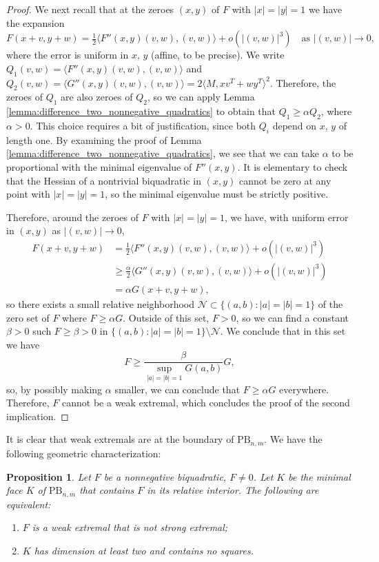 \documentclass[a4paper]{article}
\numberwithin{equation}{section}
\newtheorem{prop}[theorem]{Proposition}
\theoremstyle{definition}
\theoremstyle{remark}
\newcommand{\pbnm}{\mathrm{PB}_{n,m}}
\begin{document}
\begin{proof}
We next recall that at the zeroes $(x,y)$ of $F$ with $|x|=|y|=1$  we have the expansion
$$
F(x+v,y+w)=\tfrac{1}{2}\langle F''(x,y)(v,w),(v,w)\rangle+o(|(v,w)|^3)\quad\text{as }|(v,w)|\to 0,
$$
where the error is uniform in $x,\,y$ (affine, to be precise). We write $Q_1(v,w)=\langle F''(x,y)(v,w),(v,w)\rangle$ and $Q_2(v,w)=\langle G''(x,y)(v,w),(v,w)\rangle=2\langle M,xv^T+wy^T\rangle^2$. Therefore, the zeroes of $Q_1$ are also zeroes of $Q_2$, so we can apply Lemma \ref{lemma:difference_two_nonnegative_quadratics} to obtain that $Q_1\geq \alpha Q_2$, where $\alpha>0$. This choice requires a bit of justification, since both $Q_i$ depend on $x,\,y$ of length one. By examining the proof of Lemma \ref{lemma:difference_two_nonnegative_quadratics}, we see that we can take $\alpha$ to be proportional with the minimal eigenvalue of $F''(x,y)$. It is elementary to check that the Hessian of a nontrivial biquadratic in $(x,y)$ cannot be zero at any point with $|x|=|y|=1$, so the minimal eigenvalue must be strictly positive.

Therefore, around the zeroes of $F$ with $|x|=|y|=1$, we have, with uniform error in $(x,y)$ as $|(v,w)|\to 0$,
\begin{align*}
    F(x+v,y+w)&=\tfrac{1}{2}\langle F''(x,y)(v,w),(v,w)\rangle+o(|(v,w)|^3)\\
    &\geq \tfrac{\alpha}{2}\langle G''(x,y)(v,w),(v,w)\rangle+o(|(v,w)|^3)\\
    &= \alpha G(x+v,y+w),
\end{align*}
so there exists a small relative neighborhood $\mathcal N\subset \{(a,b)\colon |a|=|b|=1\}$ of the zero set of $F$ where $F\geq \alpha G$. Outside of this set, $F>0$, so we can find a constant $\beta>0$ such $F\geq \beta >0$ in $\{(a,b)\colon |a|=|b|=1\}\setminus \mathcal N $. We conclude that in this set we have
$$
F\geq \frac{\beta}{\sup_{|a|=|b|=1}G(a,b)} G,
$$
so, by possibly making $\alpha$ smaller, we can conclude that $F\geq \alpha G$ everywhere. Therefore, $F$ cannot be a weak extremal, which concludes the proof of the second implication.
\end{proof}

It is clear that weak extremals are at the boundary of $\pbnm$. We have the following geometric characterization:
\begin{prop}\label{prop:WE_relint_of_face}
Let $F$ be a nonnegative biquadratic, $F\neq 0$. Let $K$ be the minimal face $K$ of $\pbnm$ that contains $F$ in its relative interior. The following are equivalent:
\begin{enumerate}
    \item $F$ is a weak extremal that is not strong extremal;
    \item $K$ has dimension at least two and contains no squares.
\end{enumerate}
\end{prop}
\end{document}
